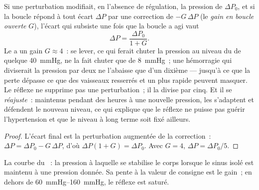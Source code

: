 \begin{theorem}\label{thm:b2:blood-pressure:gain}
Si une perturbation modifiait, en l'absence de régulation, la pression
de $\Delta P_0$, et si la boucle répond à tout écart $\Delta P$ par une
correction de $-G\,\Delta P$ (le \emph{gain en boucle ouverte} $G$),
l'écart qui subsiste une fois que la boucle a agi vaut
\[
\Delta P = \frac{\Delta P_0}{1 + G}.
\]
Le  a un gain $G \approx 4$~: se lever, ce qui ferait chuter
la pression au niveau du  de quelque \qty{40}{mmHg}, ne la fait
chuter que de \qty{8}{mmHg}~; une hémorragie qui diviserait la pression
par deux ne l'abaisse que d'un dixième --- jusqu'à ce que la perte
dépasse ce que des vaisseaux resserrés et un  plus rapide peuvent
masquer. Le réflexe ne supprime pas une perturbation~; il la divise par
cinq. Et il se \emph{réajuste}~: maintenus pendant des heures à une
nouvelle pression, les  s'adaptent et défendent le
nouveau niveau, ce qui explique que le réflexe ne puisse pas guérir
l'hypertension et que le niveau à long terme soit fixé ailleurs.
\end{theorem}
\begin{proof}
L'écart final est la perturbation augmentée de la correction~:
$\Delta P = \Delta P_0 - G\,\Delta P$, d'où $\Delta P(1 + G) =
\Delta P_0$. Avec $G = 4$, $\Delta P = \Delta P_0/5$.
\end{proof}

\begin{omfigure}

{\small La courbe du ~: la pression à laquelle se stabilise le
corps lorsque le sinus isolé est maintenu à une pression donnée. Sa pente
à la valeur de consigne est le gain~; en dehors de
\qtyrange{60}{160}{mmHg}, le réflexe est saturé.}
\end{omfigure}


